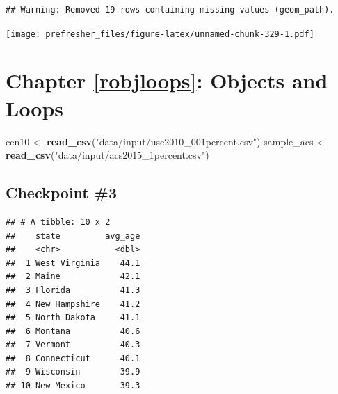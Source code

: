 \documentclass[]{book}
\newenvironment{Shaded}{\begin{snugshade}}{\end{snugshade}}
\newcommand{\KeywordTok}[1]{\textcolor[rgb]{0.13,0.29,0.53}{\textbf{#1}}}
\newcommand{\DataTypeTok}[1]{\textcolor[rgb]{0.13,0.29,0.53}{#1}}
\newcommand{\DecValTok}[1]{\textcolor[rgb]{0.00,0.00,0.81}{#1}}
\newcommand{\StringTok}[1]{\textcolor[rgb]{0.31,0.60,0.02}{#1}}
\newcommand{\OperatorTok}[1]{\textcolor[rgb]{0.81,0.36,0.00}{\textbf{#1}}}
\newcommand{\NormalTok}[1]{#1}
\theoremstyle{definition}
\theoremstyle{definition}
\theoremstyle{definition}
\theoremstyle{remark}
\begin{document}
\begin{verbatim}
## Warning: Removed 19 rows containing missing values (geom_path).
\end{verbatim}

\texttt{[image: prefresher\_files/figure-latex/unnamed-chunk-329-1.pdf]}

\section{Chapter \ref{robjloops}: Objects and
Loops}\label{chapter-refrobjloops-objects-and-loops}

\begin{Shaded}
\begin{Highlighting}[]
\NormalTok{cen10 <-}\StringTok{ }\KeywordTok{read_csv}\NormalTok{(}\StringTok{"data/input/usc2010_001percent.csv"}\NormalTok{)}
\NormalTok{sample_acs <-}\StringTok{ }\KeywordTok{read_csv}\NormalTok{(}\StringTok{"data/input/acs2015_1percent.csv"}\NormalTok{)}
\end{Highlighting}
\end{Shaded}

\subsection*{Checkpoint \#3}\label{checkpoint-3}

\begin{Shaded}
\end{Shaded}

\begin{verbatim}
## # A tibble: 10 x 2
##    state         avg_age
##    <chr>           <dbl>
##  1 West Virginia    44.1
##  2 Maine            42.1
##  3 Florida          41.3
##  4 New Hampshire    41.2
##  5 North Dakota     41.1
##  6 Montana          40.6
##  7 Vermont          40.3
##  8 Connecticut      40.1
##  9 Wisconsin        39.9
## 10 New Mexico       39.3
\end{verbatim}
\end{document}
